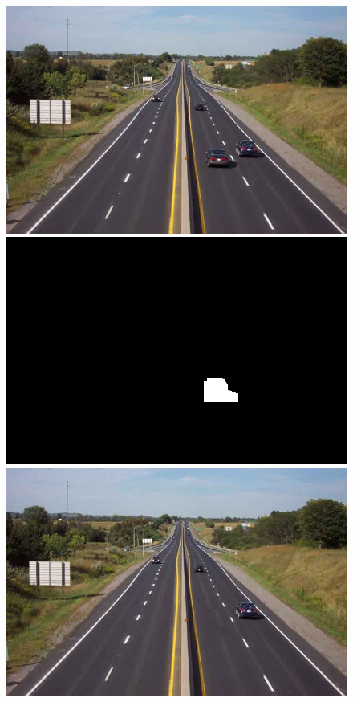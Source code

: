 \documentclass[a4paper, 10pt]{article}
\begin{document}
\begin{figure}
\begin{minipage}{.4\textwidth}
\centering
\includegraphics[scale=0.14]{images/highway.jpg}
\end{minipage}%
\begin{minipage}{.4\textwidth}
\centering
\includegraphics[scale=0.14]{highway-mask.png}
\end{minipage}%
\begin{minipage}{.4\textwidth}
\centering
\includegraphics[scale=0.14]{inpainted_highway17.png}
\end{minipage}%

\end{figure}
\end{document}
